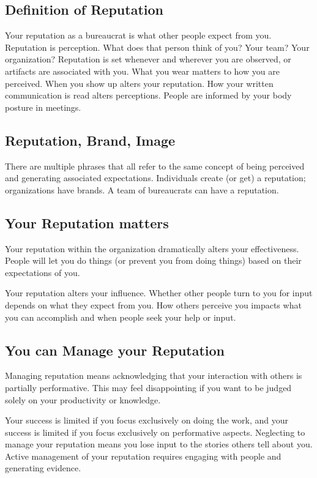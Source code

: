\subsection*{Definition of Reputation}

Your \gls{reputation} as a bureaucrat is what other people expect from you. \iftoggle{glossaryinmargin}{\marginpar{[Glossary]}}{}%
%
Reputation is perception. What does that person think of you? Your team? Your organization? 
Reputation is set whenever and wherever you are observed, or artifacts are associated with you. 
What you wear matters to how you are perceived. When you show up alters your reputation. How your written communication is read alters perceptions. People are informed by your body posture in meetings. 

\subsection*{Reputation, Brand, Image}

There are multiple phrases that all refer to the same concept of being perceived and generating associated expectations. Individuals create (or get) a reputation; organizations have brands. A team of bureaucrats can have a reputation. 

\subsection*{Your Reputation matters}

Your reputation within the organization dramatically alters your effectiveness. People will let you do things (or prevent you from doing things) based on their expectations of you. 

Your reputation alters your influence. Whether other people turn to you for input depends on what they expect from you. How others perceive you impacts what you can accomplish and when people seek your help or input.

\subsection*{You can Manage your Reputation}

Managing reputation means acknowledging that your interaction with others is partially performative. This may feel disappointing if you want to be judged solely on your productivity or knowledge. 

Your success is limited if you focus exclusively on doing the work, and your success is limited if you focus exclusively on performative aspects. 
Neglecting to manage your reputation means you lose input to the stories others tell about you. Active management of your reputation requires engaging with people and generating evidence. 

